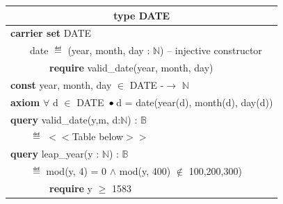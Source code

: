 \documentclass[runningheads,12pt]{article}
\begin{document}
%

\begin{table}[H]
{
\centering
\begin{tabular}{|l|}

\hline
\multicolumn{1}{|c|}{\textbf{type DATE}}\\

\hline
\textbf{carrier set} DATE\\
$\qquad$date $\eqdef$ (year, month, day : $\mathbb{N}$)    -- injective constructor\\
$\qquad$$\qquad$\textbf{require} valid\_date(year, month, day)\\
\textbf{const} year, month, day $\in$ DATE -$\rightarrow$  $\mathbb{N}$\\
\textbf{axiom} $\forall$ d $\in$ DATE $ \,\bullet\,$d = date(year(d), month(d), day(d))\\
\textbf{query} valid\_date(y,m, d:$\mathbb{N}$) : $\mathbb{B}$\\
$\qquad$$\eqdef$ $<$$<$Table below$>$$>$\\
\textbf{query} leap\_year(y : $\mathbb{N}$) : $\mathbb{B}$\\
$\qquad$$\eqdef$ mod(y, 4) = 0 $\land$ mod(y, 400) $\notin$ {100,200,300)}\\
$\qquad$$\qquad$\textbf{require} y $\ge$ 1583\\


\hline
\end{tabular}
}
\end{table}
\end{document}
